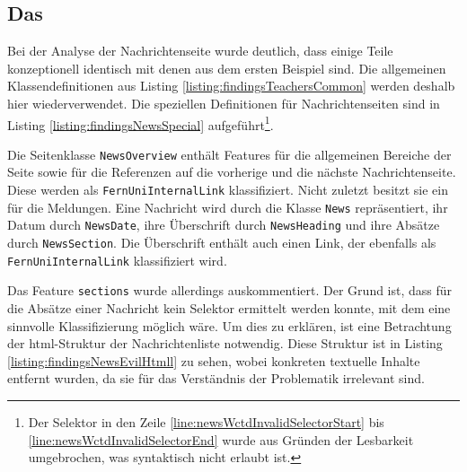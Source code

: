 \subsection{Das {\classificationModel}}
    \label{section:findingsNewsClasses}
    Bei der Analyse der Nachrichtenseite wurde deutlich,
    dass einige Teile konzeptionell identisch mit denen aus dem ersten Beispiel sind.
    Die allgemeinen Klassendefinitionen aus Listing \ref{listing:findingsTeachersCommon}
    werden deshalb hier wiederverwendet.
    Die speziellen Definitionen für Nachrichtenseiten sind in
    Listing \ref{listing:findingsNewsSpecial}
    aufgeführt\footnote{Der Selektor in den Zeile \ref{line:newsWctdInvalidSelectorStart}
    bis \ref{line:newsWctdInvalidSelectorEnd} wurde aus Gründen der Lesbarkeit umgebrochen,
    was syntaktisch nicht erlaubt ist.}.

    

    Die Seitenklasse \texttt{NewsOverview} enthält Features für die
    allgemeinen Bereiche der Seite sowie für die Referenzen auf die vorherige und die nächste
    Nachrichtenseite. Diese werden als \texttt{FernUniInternalLink} klassifiziert.
    Nicht zuletzt besitzt sie ein {\collectionFeature} für die Meldungen.
    Eine Nachricht wird durch die Klasse \texttt{News} repräsentiert,
    ihr Datum durch \texttt{NewsDate}, ihre Überschrift durch \texttt{NewsHeading}
    und ihre Absätze durch \texttt{NewsSection}.
    Die Überschrift enthält auch einen Link,
    der ebenfalls als \texttt{FernUniInternalLink} klassifiziert wird.

    Das Feature \texttt{sections} wurde allerdings auskommentiert.
    Der Grund ist, dass für die Absätze einer Nachricht kein Selektor ermittelt werden konnte,
    mit dem eine sinnvolle Klassifizierung möglich wäre.
    Um dies zu erklären, ist eine Betrachtung der \gls{html}-Struktur der Nachrichtenliste notwendig.
    Diese Struktur ist in Listing \ref{listing:findingsNewsEvilHtmll}
    zu sehen, wobei konkreten textuelle Inhalte entfernt wurden,
    da sie für das Verständnis der Problematik irrelevant sind.

    

